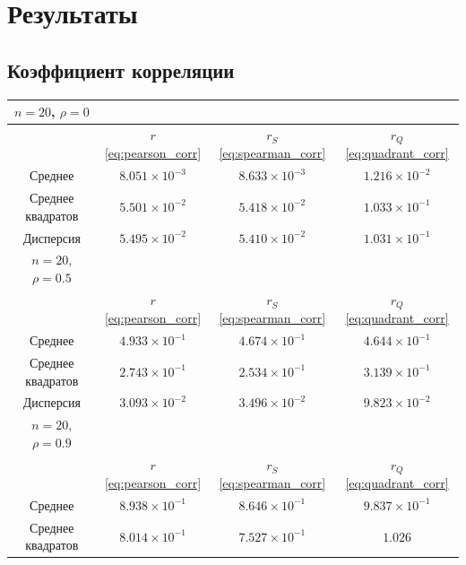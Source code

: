 \documentclass[12pt,a4paper]{article}
\begin{document}
	\section{Результаты}

	\subsection{Коэффициент корреляции}

	\begin{table}[htbp!]
		\centering
		\begin{tabular}{ |c|c|c|c| }
			\hline
			\( n = 20 \), \( \rho = 0 \) & & & \\
			\hline
			& \( r \) \eqref{eq:pearson_corr} & \( r_S \) \eqref{eq:spearman_corr} &
			\( r_Q \) \eqref{eq:quadrant_corr} \\
			\hline
			Среднее & \( 8.051 \times 10^{-3} \) & \( 8.633 \times 10^{-3} \) &
			\( 1.216 \times 10^{-2} \) \\
			\hline
			Среднее квадратов & \( 5.501 \times 10^{-2} \) &
			\( 5.418 \times 10^{-2} \) & \( 1.033 \times 10^{-1} \) \\
			\hline
			Дисперсия & \( 5.495 \times 10^{-2} \) &
			\( 5.410 \times 10^{-2} \) & \( 1.031 \times 10^{-1} \) \\
			\hline
			\hline
			\( n = 20 \), \( \rho = 0.5 \) & & & \\
			\hline
			& \( r \) \eqref{eq:pearson_corr} & \( r_S \) \eqref{eq:spearman_corr} &
			\( r_Q \) \eqref{eq:quadrant_corr} \\
			\hline
			Среднее & \( 4.933 \times 10^{-1} \) & \( 4.674 \times 10^{-1} \) &
			\( 4.644 \times 10^{-1} \) \\
			\hline
			Среднее квадратов & \( 2.743 \times 10^{-1} \) &
			\( 2.534 \times 10^{-1} \) & \( 3.139 \times 10^{-1} \) \\
			\hline
			Дисперсия & \( 3.093 \times 10^{-2} \) &
			\( 3.496 \times 10^{-2} \) & \( 9.823 \times 10^{-2} \) \\
			\hline
			\hline
			\( n = 20 \), \( \rho = 0.9 \) & & & \\
			\hline
			& \( r \) \eqref{eq:pearson_corr} & \( r_S \) \eqref{eq:spearman_corr} &
			\( r_Q \) \eqref{eq:quadrant_corr} \\
			\hline
			Среднее & \( 8.938 \times 10^{-1} \) & \( 8.646 \times 10^{-1} \) &
			\( 9.837 \times 10^{-1} \) \\
			\hline
			Среднее квадратов & \( 8.014 \times 10^{-1} \) &
			\( 7.527 \times 10^{-1} \) & \( 1.026 \) \\

\end{tabular}
\end{table}
\end{document}
